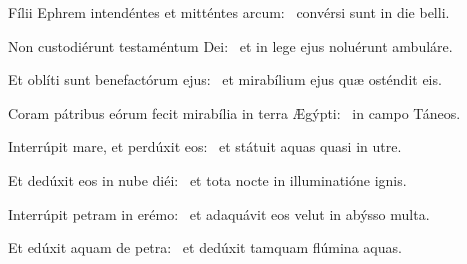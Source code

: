 
\item Fílii Ephrem intendéntes et mitténtes arcum:~\psstar{} convérsi sunt in die belli.

\item Non custodiérunt testaméntum Dei:~\psstar{} et in lege ejus noluérunt ambuláre.

\item Et oblíti sunt benefactórum ejus:~\psstar{} et mirabílium ejus quæ osténdit eis.

\item Coram pátribus eórum fecit mirabília in terra Ægýpti:~\psstar{} in campo Táneos.

\item Interrúpit mare, et perdúxit eos:~\psstar{} et státuit aquas quasi in utre.

\item Et dedúxit eos in nube diéi:~\psstar{} et tota nocte in illuminatióne ignis.

\item Interrúpit petram in erémo:~\psstar{} et adaquávit eos velut in abýsso multa.

\item Et edúxit aquam de petra:~\psstar{} et dedúxit tamquam flúmina aquas.
